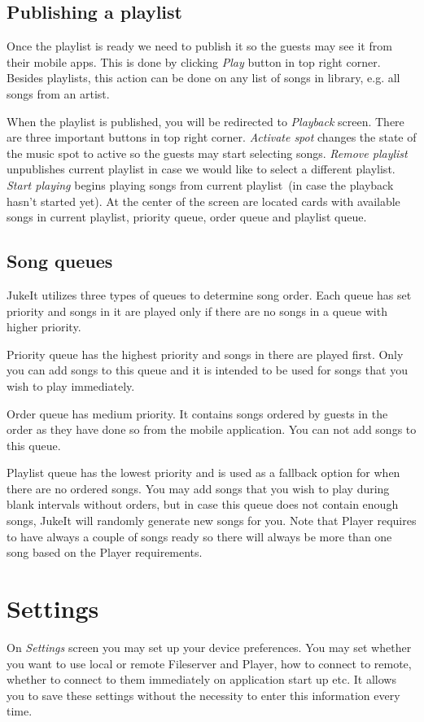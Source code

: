 \subsection{Publishing a playlist}

Once the playlist is ready we need to publish it so the guests may see it from their mobile apps. This is done by clicking \emph{Play} button in top right corner. Besides playlists, this action can be done on any list of songs in library, e.g. all songs from an artist.
\par
When the playlist is published, you will be redirected to \emph{Playback} screen. There are three important buttons in top right corner. \emph{Activate spot} changes the state of the music spot to active so the guests may start selecting songs. \emph{Remove playlist} unpublishes current playlist in case we would like to select a different playlist. \emph{Start playing} begins playing songs from current playlist~(in case the playback hasn't started yet). At the center of the screen are located cards with available songs in current playlist, priority queue, order queue and playlist queue.

\subsection{Song queues}

JukeIt utilizes three types of queues to determine song order. Each queue has set priority and songs in it are played only if there are no songs in a queue with higher priority.
\par
Priority queue has the highest priority and songs in there are played first. Only you can add songs to this queue and it is intended to be used for songs that you wish to play immediately.
\par
Order queue has medium priority. It contains songs ordered by guests in the order as they have done so from the mobile application. You can not add songs to this queue.
\par
Playlist queue has the lowest priority and is used as a fallback option for when there are no ordered songs. You may add songs that you wish to play during blank intervals without orders, but in case this queue does not contain enough songs, JukeIt will randomly generate new songs for you. Note that Player requires to have always a couple of songs ready so there will always be more than one song based on the Player requirements.

\section{Settings}

On \emph{Settings} screen you may set up your device preferences. You may set whether you want to use local or remote Fileserver and Player, how to connect to remote, whether to connect to them immediately on application start up etc. It allows you to save these settings without the necessity to enter this information every time.
